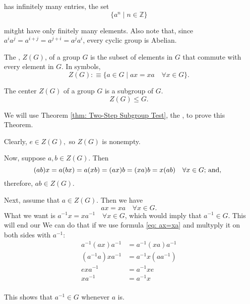 has infinitely many entries, the set
\begin{equation}
  \{ a^{n} \mid n \in \mathbb{Z} \}
\end{equation}

mitght have only finitely many elements. Also note that, since $a^ia^j=a^{i+j}=a^{j+i}=a^ja^i$, every cyclic group is Abelian.

\begin{mydef}
  The , $Z(G)$, of a group $G$ is the subset of elements in $G$ that commute with every element in $G$. In symbols,
  \begin{equation}
    Z(G) :\equiv \{a \in G \mid ax = xa \quad \forall x \in G \}.
  \end{equation}

\end{mydef}


\begin{thm}
  \label{thm: Center Is a Subgroup}
  The center $Z(G)$ of a group $G$ is a subgroup of $G$.
  \begin{equation}
    Z(G) \leq G.
  \end{equation}
\end{thm}
\begin{prf}
  We will use Theorem \ref{thm: Two-Step Subgroup Test}, the , to prove this Theorem.

  Clearly, $e\in Z(G),$ so $Z(G)$ is nonempty.

  Now, suppose $a,b \in Z(G).$ Then
  \begin{equation}
    (ab)x = a(bx) = a(xb) = (ax) b = (xa)b = x (ab) \quad \forall x \in G; $ and, $
  \end{equation}
  therefore, $ab \in Z(G)$.

  Next, assume that $a \in Z(G)$. Then we have
  \begin{equation}
    \label{eq: ax=xa}
    ax = xa \quad \forall x \in G.
  \end{equation}
  What we want is $a^{-1}x = xa^{-1} \quad \forall x\in G$, which would imply that $a^{-1} \in G.$ This will end our  We can do that if we use formula \eqref{eq: ax=xa} and multyply it on both sides with $a^{-1}$:
  \begin{equation}
    \begin{aligned}
      a^{-1}(ax)a^{-1}  &=a^{-1}(xa)a^{-1}\\
      (a^{-1}a)xa^{-1}&=a^{-1}x(aa^{-1}) \\
      exa^{-1}&=a^{-1}xe \\
      xa^{-1}&=a^{-1}x \\
    \end{aligned}
  \end{equation}

  This shows that $a^{-1} \in G$ whenever $a$ is.
\end{prf}

